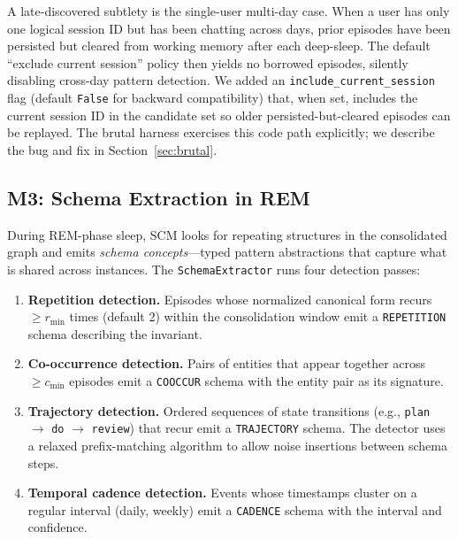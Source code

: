 \documentclass[11pt,twocolumn]{article}
\begin{document}
A late-discovered subtlety is the single-user multi-day case. When a user has only one logical session ID but has been chatting across days, prior episodes have been persisted but cleared from working memory after each deep-sleep. The default ``exclude current session'' policy then yields no borrowed episodes, silently disabling cross-day pattern detection. We added an \texttt{include\_current\_session} flag (default \texttt{False} for backward compatibility) that, when set, includes the current session ID in the candidate set so older persisted-but-cleared episodes can be replayed. The brutal harness exercises this code path explicitly; we describe the bug and fix in Section~\ref{sec:brutal}.

\subsection{M3: Schema Extraction in REM}

During REM-phase sleep, SCM looks for repeating structures in the consolidated graph and emits \emph{schema concepts}---typed pattern abstractions that capture what is shared across instances. The \texttt{SchemaExtractor} runs four detection passes:

\begin{enumerate}[leftmargin=*]
\item \textbf{Repetition detection.} Episodes whose normalized canonical form recurs $\geq r_{\min}$ times (default 2) within the consolidation window emit a \texttt{REPETITION} schema describing the invariant.
\item \textbf{Co-occurrence detection.} Pairs of entities that appear together across $\geq c_{\min}$ episodes emit a \texttt{COOCCUR} schema with the entity pair as its signature.
\item \textbf{Trajectory detection.} Ordered sequences of state transitions (e.g., \texttt{plan} $\to$ \texttt{do} $\to$ \texttt{review}) that recur emit a \texttt{TRAJECTORY} schema. The detector uses a relaxed prefix-matching algorithm to allow noise insertions between schema steps.
\item \textbf{Temporal cadence detection.} Events whose timestamps cluster on a regular interval (daily, weekly) emit a \texttt{CADENCE} schema with the interval and confidence.
\end{enumerate}
\end{document}
